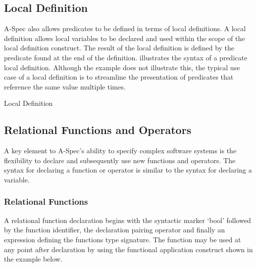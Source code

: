 \documentclass[letterpaper,10pt,draft]{book}
\begin{document}
\subsection{Local Definition}
   \label{sect:LetPred}

A-Spec also allows predicates to be defined in terms of local definitions.  A local
definition allows local variables to be declared and used within the scope of the
local definition construct.  The result of the local definition is defined by the
predicate found at the end of the definition.   illustrates the
syntax of a predicate local definition.  Although the example does not illustrate
this, the typical use case of a local definition is to streamline the presentation
of predicates that reference the same value multiple times.

\begin{example}
\begin{minipage}[t]{0.49\linewidth}
   
\end{minipage}
\begin{minipage}[t]{0.49\linewidth}
   \azbox
   
\end{minipage}

   \caption{Local Definition}
   \label{ex:LetPred}
\end{example}

\subsection{Relational Functions and Operators}
   \label{sect:PredFuncOp}

A key element to A-Spec's ability to specify complex software systems is the flexibility
to declare and subsequently use new functions and operators.  The syntax for declaring
a function or operator is similar to the syntax for declaring a variable.

\subsubsection{Relational Functions}
   \label{sect:PredFunc}

A relational function declaration begins with the syntactic marker `bool' followed
by the function identifier, the declaration pairing operator and finally an expression
defining the functions type signature.  The function may be used at any point after
declaration by using the functional application construct shown in the example below.
\end{document}
